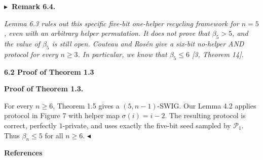 \documentclass[10pt,a4paper]{article}
\begin{document}


\par\medskip\noindent\textbf{
$\blacktriangleright$ Remark 6.4.
}\par



\emph{Lemma 6.3 rules out this specific five-bit one-helper recycling framework for $n=5$, even with an arbitrary helper permutation. It does not prove that $\beta_{5}>5$, and the value of $\beta_{5}$ is still open. Couteau and Rosén give a six-bit no-helper AND protocol for every $n\geq 3$. In particular, we know that $\beta_{5}\leq 6$ [3, Theorem 14].}\par








\par\medskip\noindent\textbf{
6.2 Proof of Theorem 1.3
}\par




\par\medskip\noindent\textbf{Proof of Theorem 1.3.}\par




For every $n\geq 6$, Theorem 1.5 gives a $(5,n-1)$-SWIG. Our Lemma 4.2 applies protocol in Figure 7 with helper map $\sigma(i)=i-2$. The resulting protocol is correct, perfectly $1$-private, and uses exactly the five-bit seed sampled by $\mathcal{P}_{1}$. Thus $\beta_{n}\leq 5$ for all $n\geq 6$.
$\blacktriangleleft$\par







\par\medskip\noindent\textbf{References}\par
\end{document}
